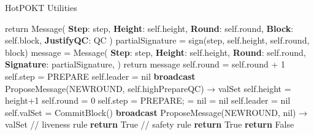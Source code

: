 \documentclass[a4paper]{article}
\begin{document}
\begin{algorithm}
\caption{HotPOKT Utilities}
    \begin{algorithmic}[1]
        \State return  {Message}(
          \State \indent \textbf{Step}: step,
          \State \indent \textbf{Height}: self.height,
          \State \indent \textbf{Round}: self.round,
          \State \indent \textbf{Block}: self.block,
          \State \indent \textbf{JustifyQC}: QC
          \State )
      \EndFunction
      \vspace {5 mm}
        \State partialSignature = sign(step, self.height, self.round, block)
        \State message = {Message}(
          \State \indent \textbf{Step}: step,
          \State \indent \textbf{Height}: self.height,
          \State \indent \textbf{Round}: self.round,
          \State \indent \textbf{Signature}: partialSignature,
          \State )
        \State return message
      \EndFunction
      \vspace {5 mm}
        \State self.round = self.round + 1
        \State self.step = PREPARE
        \State self.leader = nil
        \State \textbf{broadcast} ProposeMessage(NEWROUND, self.highPrepareQC) → valSet
      \EndFunction
      \vspace {5 mm}
        \State self.height = height+1
        \State self.round = 0
        \State self.step = PREPARE;
         = nil
         = nil
        \State self.leader = nil
        \State self.valSet = CommitBlock()
        \State \textbf{broadcast} ProposeMessage(NEWROUND, nil) → valSet
      \EndFunction
      \vspace{5 mm}
             {\color{Gray} { // liveness rule}}
             \State \textbf{return} True
           \Else
              {\color{Gray} { // safety rule}}
                \State\textbf{return} True
             \EndIf
           \EndIf
         \EndIf
         \State \textbf{return} False
       \EndFunction
    \end{algorithmic}
\end{algorithm}
\end{document}
